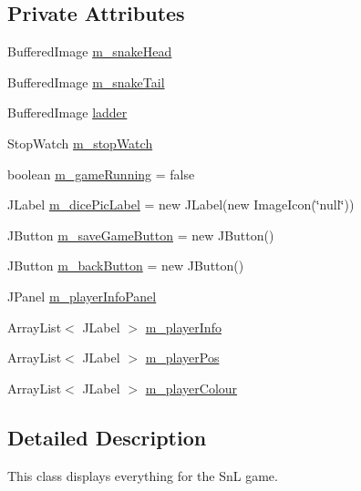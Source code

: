 \subsection*{Private Attributes}
\begin{DoxyCompactItemize}
\item 
Buffered\+Image \hyperlink{class_display_1_1_display_sn_l_ad8119225e6027adeced313ef342b67a2}{m\+\_\+snake\+Head}
\item 
Buffered\+Image \hyperlink{class_display_1_1_display_sn_l_a6821965beb6bde17ff10f6e3e09f3287}{m\+\_\+snake\+Tail}
\item 
Buffered\+Image \hyperlink{class_display_1_1_display_sn_l_a4f2e517153c6066a9ba3d627728ed51c}{ladder}
\item 
Stop\+Watch \hyperlink{class_display_1_1_display_sn_l_a4e69018d83aaba48baa701597a876bf6}{m\+\_\+stop\+Watch}
\item 
boolean \hyperlink{class_display_1_1_display_sn_l_a45db4653b01756f831e54afb47f9010b}{m\+\_\+game\+Running} = false
\item 
J\+Label \hyperlink{class_display_1_1_display_sn_l_aafb6d505956de58bbd229a789342ef19}{m\+\_\+dice\+Pic\+Label} = new J\+Label(new Image\+Icon(\char`\"{}null\char`\"{}))
\item 
J\+Button \hyperlink{class_display_1_1_display_sn_l_a7ae26c71761566ba21e8eb4e4981969f}{m\+\_\+save\+Game\+Button} = new J\+Button()
\item 
J\+Button \hyperlink{class_display_1_1_display_sn_l_a9452f0a663eaea507cf3561851e5c74e}{m\+\_\+back\+Button} = new J\+Button()
\item 
J\+Panel \hyperlink{class_display_1_1_display_sn_l_a7afa5f7ca8e697b64de4de4246f2c2a8}{m\+\_\+player\+Info\+Panel}
\item 
Array\+List$<$ J\+Label $>$ \hyperlink{class_display_1_1_display_sn_l_ad4d75120b08606844b7fa63e2990928b}{m\+\_\+player\+Info}
\item 
Array\+List$<$ J\+Label $>$ \hyperlink{class_display_1_1_display_sn_l_aa4b30638e1d8f99b5052652ea02d6365}{m\+\_\+player\+Pos}
\item 
Array\+List$<$ J\+Label $>$ \hyperlink{class_display_1_1_display_sn_l_a075a16b363ea3d1e75e589fe11b2b0e7}{m\+\_\+player\+Colour}
\end{DoxyCompactItemize}


\subsection{Detailed Description}
This class displays everything for the Sn\+L game. 

